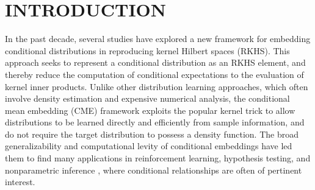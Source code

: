 \documentclass[accepted]{article}
\theoremstyle{definition}
\begin{document}
%

%

\begin{abstract}
We develop novel learning rates for conditional mean embeddings by applying the theory of interpolation for reproducing kernel Hilbert spaces (RKHS). We derive explicit, adaptive convergence rates for the sample estimator under the misspecifed setting, where the target operator is not Hilbert-Schmidt or bounded with respect to the input/output RKHSs. We demonstrate that in certain parameter regimes, we can achieve uniform convergence rates in the output RKHS. We hope our analyses will allow the much broader application of conditional mean embeddings to more complex ML/RL settings involving infinite dimensional RKHSs and continuous state spaces.
\end{abstract}


\section{INTRODUCTION}
In the past decade, several studies have explored a new framework for embedding conditional distributions in reproducing kernel Hilbert spaces (RKHS). This approach seeks to represent a conditional distribution as an RKHS element, and thereby reduce the computation of conditional expectations to the evaluation of kernel inner products. Unlike other distribution learning approaches, which often involve density estimation and expensive numerical analysis, the conditional mean embedding (CME) framework exploits the popular kernel trick to allow distributions to be learned directly and efficiently from sample information, and do not require the target distribution to possess a density function. The broad generalizability and computational levity of conditional embeddings have led them to find many applications in reinforcement learning, hypothesis testing, and nonparametric inference \citep{fukumizu2007kernel, fukumizu2009kernel, grunewalder2012modelling, song2010nonparametric}, where conditional relationships are often of pertinent interest. 
\end{document}
